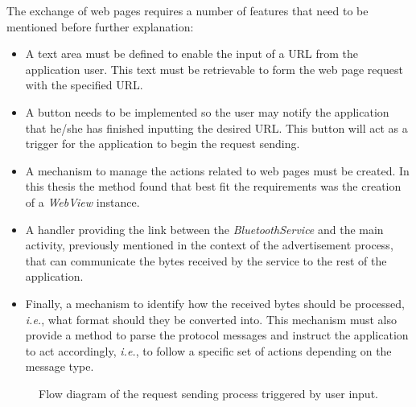 The exchange of web pages requires a number of features that need to be mentioned before further explanation:

\begin{itemize}
	\item  A text area must be defined to enable the input of a \gls{URL} from the application user. This text must be retrievable to form the web page request with the specified \gls{URL}.
	
	\item A button needs to be implemented so the user may notify the application that he/she has finished inputting the desired \gls{URL}. This button will act as a trigger for the application to begin the request sending.
	
	\item A mechanism to manage the actions related to web pages must be created. In this thesis the method found that best fit the requirements was the creation of a \textit{WebView} instance.
	
	\item A handler providing the link between the \textit{BluetoothService} and the main activity, previously mentioned in the context of the advertisement process, that can communicate the bytes received by the service to the rest of the application.
	
	\item Finally, a mechanism to identify how the received bytes should be processed, \textit{i.e.}, what format should they be converted into. This mechanism must also provide a method to parse the protocol messages and instruct the application to act accordingly, \textit{i.e.}, to follow a specific set of actions depending on the message type.
\end{itemize}

\begin{figure}[ht]
	\noindent{}
	\caption{\label{fig:rqtflux} Flow diagram of the request sending process triggered by user input.}
\end{figure}

